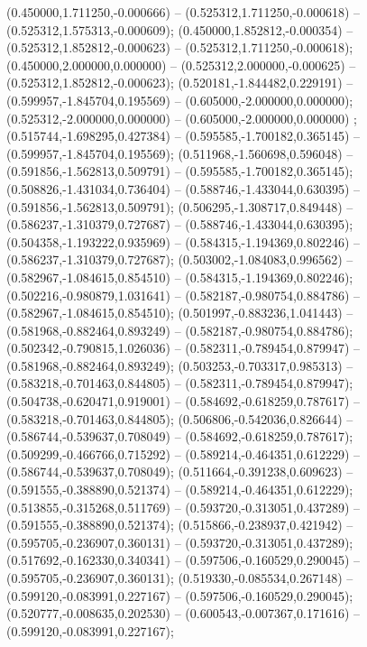  (0.450000,1.711250,-0.000666) -- (0.525312,1.711250,-0.000618) -- (0.525312,1.575313,-0.000609);
 (0.450000,1.852812,-0.000354) -- (0.525312,1.852812,-0.000623) -- (0.525312,1.711250,-0.000618);
 (0.450000,2.000000,0.000000) -- (0.525312,2.000000,-0.000625) -- (0.525312,1.852812,-0.000623);
 (0.520181,-1.844482,0.229191) -- (0.599957,-1.845704,0.195569) -- (0.605000,-2.000000,0.000000);
 (0.525312,-2.000000,0.000000) -- (0.605000,-2.000000,0.000000) ;
 (0.515744,-1.698295,0.427384) -- (0.595585,-1.700182,0.365145) -- (0.599957,-1.845704,0.195569);
 (0.511968,-1.560698,0.596048) -- (0.591856,-1.562813,0.509791) -- (0.595585,-1.700182,0.365145);
 (0.508826,-1.431034,0.736404) -- (0.588746,-1.433044,0.630395) -- (0.591856,-1.562813,0.509791);
 (0.506295,-1.308717,0.849448) -- (0.586237,-1.310379,0.727687) -- (0.588746,-1.433044,0.630395);
 (0.504358,-1.193222,0.935969) -- (0.584315,-1.194369,0.802246) -- (0.586237,-1.310379,0.727687);
 (0.503002,-1.084083,0.996562) -- (0.582967,-1.084615,0.854510) -- (0.584315,-1.194369,0.802246);
 (0.502216,-0.980879,1.031641) -- (0.582187,-0.980754,0.884786) -- (0.582967,-1.084615,0.854510);
 (0.501997,-0.883236,1.041443) -- (0.581968,-0.882464,0.893249) -- (0.582187,-0.980754,0.884786);
 (0.502342,-0.790815,1.026036) -- (0.582311,-0.789454,0.879947) -- (0.581968,-0.882464,0.893249);
 (0.503253,-0.703317,0.985313) -- (0.583218,-0.701463,0.844805) -- (0.582311,-0.789454,0.879947);
 (0.504738,-0.620471,0.919001) -- (0.584692,-0.618259,0.787617) -- (0.583218,-0.701463,0.844805);
 (0.506806,-0.542036,0.826644) -- (0.586744,-0.539637,0.708049) -- (0.584692,-0.618259,0.787617);
 (0.509299,-0.466766,0.715292) -- (0.589214,-0.464351,0.612229) -- (0.586744,-0.539637,0.708049);
 (0.511664,-0.391238,0.609623) -- (0.591555,-0.388890,0.521374) -- (0.589214,-0.464351,0.612229);
 (0.513855,-0.315268,0.511769) -- (0.593720,-0.313051,0.437289) -- (0.591555,-0.388890,0.521374);
 (0.515866,-0.238937,0.421942) -- (0.595705,-0.236907,0.360131) -- (0.593720,-0.313051,0.437289);
 (0.517692,-0.162330,0.340341) -- (0.597506,-0.160529,0.290045) -- (0.595705,-0.236907,0.360131);
 (0.519330,-0.085534,0.267148) -- (0.599120,-0.083991,0.227167) -- (0.597506,-0.160529,0.290045);
 (0.520777,-0.008635,0.202530) -- (0.600543,-0.007367,0.171616) -- (0.599120,-0.083991,0.227167);
